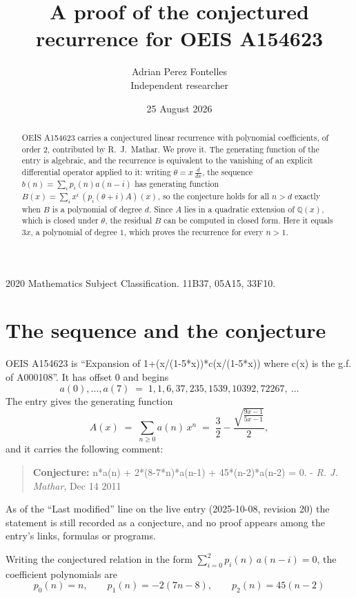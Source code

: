 \documentclass[11pt,a4paper]{article}
\title{A proof of the conjectured recurrence for OEIS A154623}
\author{Adrian Perez Fontelles\\ \small Independent researcher}
\date{25 August 2026}
\theoremstyle{plain}
\theoremstyle{definition}
\begin{document}
\maketitle

\begin{abstract}
OEIS A154623 carries a conjectured linear recurrence with polynomial coefficients, of
order 2, contributed by R.~J.~Mathar. We prove it. The generating function of the
entry is algebraic, and the recurrence is equivalent to the vanishing of an explicit
differential operator applied to it: writing $\theta=x\,\frac{d}{dx}$, the sequence
$b(n)=\sum_{i}p_{i}(n)a(n-i)$ has generating function
$B(x)=\sum_{i}x^{i}\,(p_{i}(\theta+i)A)(x)$, so the conjecture holds for all $n>d$ exactly
when $B$ is a polynomial of degree $d$. Since $A$ lies in a quadratic extension of
$\mathbb{Q}(x)$, which is closed under $\theta$, the residual $B$ can be computed in
closed form. Here it equals $3 x$, a polynomial of degree $1$, which proves
the recurrence for every $n>1$.
\end{abstract}

\noindent\small 2020 Mathematics Subject Classification. 11B37, 05A15, 33F10.\normalsize

\section{The sequence and the conjecture}

OEIS A154623 is ``Expansion of 1+(x/(1-5*x))*c(x/(1-5*x)) where c(x) is the g.f. of A000108''. It has offset $0$ and begins
\[
a(0),\dots,a(7)\;=\;1, 1, 6, 37, 235, 1539, 10392, 72267,\ \dots
\]
The entry gives the generating function
\begin{equation}\label{eq:gf}
A(x)\;=\;\sum_{n\ge 0} a(n)\,x^{n}\;=\;\frac{3}{2} - \frac{\sqrt{\frac{9 x - 1}{5 x - 1}}}{2} ,
\end{equation}
and it carries the following comment:
\begin{quote}\small
\textbf{Conjecture:} n*a(n) + 2*(8-7*n)*a(n-1) + 45*(n-2)*a(n-2) = 0. - \emph{R. J. Mathar}, Dec 14 2011
\end{quote}
As of the ``Last modified'' line on the live entry (2025-10-08, revision 20) the
statement is still recorded as a conjecture, and no proof appears among the entry's links,
formulas or programs.

Writing the conjectured relation in the form $\sum_{i=0}^{2}p_{i}(n)\,a(n-i)=0$,
the coefficient polynomials are
\[
p_{0}(n)=n,\qquad p_{1}(n)=- 2 \left(7 n - 8\right),\qquad p_{2}(n)=45 \left(n - 2\right)
\]
\end{document}
